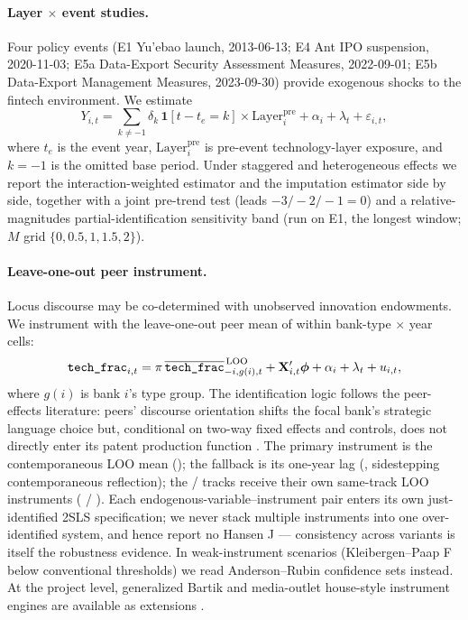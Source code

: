\paragraph{Layer $\times$ event studies.}
Four policy events (E1 Yu'ebao launch, 2013-06-13; E4 Ant IPO suspension, 2020-11-03;
E5a Data-Export Security Assessment Measures, 2022-09-01; E5b Data-Export Management
Measures, 2023-09-30) provide exogenous shocks to the fintech environment. We estimate
\begin{equation}\label{eq:eventstudy}
Y_{i,t} = \sum_{k \neq -1} \delta_k\, \mathbf{1}[t - t_e = k] \times
\mathrm{Layer}^{\mathrm{pre}}_{i} + \alpha_i + \lambda_t + \varepsilon_{i,t},
\end{equation}
where $t_e$ is the event year, $\mathrm{Layer}^{\mathrm{pre}}_i$ is pre-event
technology-layer exposure, and $k=-1$ is the omitted base period. Under staggered and
heterogeneous effects we report the \textcite{sunabraham2021eventstudy}
interaction-weighted estimator and the \textcite{borusyak2024revisiting} imputation
estimator side by side, together with a joint pre-trend test (leads $-3/-2/-1=0$) and a
\textcite{rambachan2023honestdid} relative-magnitudes partial-identification sensitivity
band (run on E1, the longest window; $M$ grid $\{0,0.5,1,1.5,2\}$).

\paragraph{Leave-one-out peer instrument.}
Locus discourse may be co-determined with unobserved innovation endowments. We
instrument with the leave-one-out peer mean of  within bank-type
$\times$ year cells:
\begin{equation}\label{eq:iv}
\texttt{tech\_frac}_{i,t} = \pi\, \overline{\texttt{tech\_frac}}^{\,\mathrm{LOO}}_{-i,g(i),t}
 + \mathbf{X}_{i,t}'\boldsymbol{\phi} + \alpha_i + \lambda_t + u_{i,t},
\end{equation}
where $g(i)$ is bank $i$'s type group. The identification logic follows the peer-effects
literature: peers' discourse orientation shifts the focal bank's strategic language
choice but, conditional on two-way fixed effects and controls, does not directly enter
its patent production function
\parencite{manski1993reflection,leary2014peereffects}. The primary instrument is the
contemporaneous LOO mean (); the fallback is its
one-year lag (, sidestepping contemporaneous
reflection); the  /  tracks receive their own same-track LOO
instruments ( /
). Each endogenous-variable--instrument pair
enters its own just-identified 2SLS specification; we never stack multiple instruments
into one over-identified system, and hence report no Hansen J — consistency across
variants is itself the robustness evidence. In weak-instrument scenarios
(Kleibergen--Paap F below conventional thresholds) we read Anderson--Rubin confidence
sets instead. At the project level, generalized Bartik and media-outlet house-style
instrument engines are available as extensions
\parencite{goldsmithpinkham2020bartik,borusyak2022shiftshare}.

